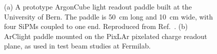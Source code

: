 \begin{figure}[!ht]
	\centering
	\caption{(a) A prototype ArgonCube light readout paddle built at the University of Bern. The paddle is 50~cm long and 10~cm wide, with four SiPMs coupled to one end. Reproduced from Ref.~\cite{argoncube_loi}. (b) ArClight paddle mounted on the PixLAr pixelated charge readout plane, as used in test beam studies at Fermilab.}
	\label{fig:arclight}
\end{figure}

